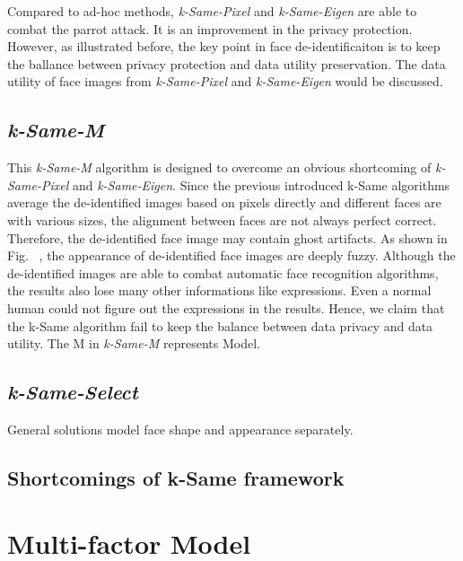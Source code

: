 	Compared to ad-hoc methods, \emph{k-Same-Pixel} and \emph{k-Same-Eigen} are able to combat the parrot attack. It is an improvement in the privacy protection. However, as illustrated before, the key point in face de-identificaiton is to keep the ballance between privacy protection and data utility preservation. The data utility of face images from \emph{k-Same-Pixel} and \emph{k-Same-Eigen} would be discussed. 
 	
 	\subsection{\emph{k-Same-M}}
 	This \emph{k-Same-M} algorithm is designed to overcome an obvious shortcoming of \emph{k-Same-Pixel} and \emph{k-Same-Eigen}. Since the previous introduced k-Same algorithms average the de-identified images based on pixels directly and different faces are with various sizes, the alignment between faces are not always perfect correct. Therefore, the de-identified face image may contain ghost artifacts. As shown in Fig. ~\cite{Gross08}, the appearance of de-identified face images are deeply fuzzy. Although the de-identified images are able to combat automatic face recognition algorithms, the results also lose many other informations like expressions. Even a normal human could not figure out the expressions in the results. Hence, we claim that the k-Same algorithm fail to keep the balance between data privacy and data utility. 
 	The M in \emph{k-Same-M} represents Model. 

	\subsection{\emph{k-Same-Select}}
	
	General solutions model face shape and appearance separately. 

	\subsection{Shortcomings of k-Same framework}

	\section{Multi-factor Model}